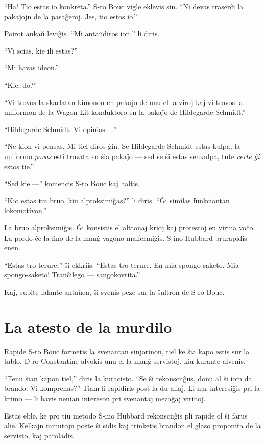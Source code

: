 ``Ha! Tio estas io konkreta.'' S-ro Bouc vigle eklevis sin. ``Ni devas traserĉi la pakaĵojn de la pasaĝeroj. Jes, tio estos io.''

Poirot ankaŭ leviĝis. ``Mi antaŭdiros ion,'' li diris.

``Vi scias, kie ili estas?''

``Mi havas ideon.''

``Kie, do?''

``Vi trovos la skarlatan kimonon en pakaĵo de unu el la viroj kaj vi trovos la uniformon de la Wagon Lit konduktoro en la pakaĵo de Hildegarde Schmidt.''

``Hildegarde Schmidt. Vi opinias---.''

``Ne kion vi pensas. Mi tiel diros ĝin. Se Hildegarde Schmidt estas kulpa, la uniformo \emph{povas} esti trovata en ŝia pakaĵo --- sed se ŝi estas senkulpa, tute \emph{certe ĝi} estos tie.''

``Sed kiel---'' komencis S-ro Bouc kaj haltis.

``Kio estas tiu bruo, kiu alproksimiĝas?'' li diris. ``Ĝi similas funkciantan lokomotivon.''

La bruo alproksimiĝis. Ĝi konsistis el alttonaj krioj kaj protestoj en virina voĉo. La pordo ĉe la fino de la manĝ-vagono malfermiĝis. S-ino Hubbard brurapidis enen.

``Estas tro terure,'' ŝi ekkriis. ``Estas tro terure. En mia spongo-saketo. Mia spongo-saketo! Tranĉilego --- sangokovrita.''

Kaj, subite falante antaŭen, ŝi svenis peze sur la ŝultron de S-ro Bouc.

\chapter[La atesto de la murdilo]{La atesto de la murdilo}


Rapide S-ro Bouc formetis la svenantan sinjorinon, tiel ke ŝia kapo estis sur la tablo. D-ro Constantine alvokis unu el la manĝ-servistoj, kiu kurante alvenis.

``Tenu ŝian kapon tiel,'' diris la kuracisto. ``Se ŝi rekonsciiĝus, donu al ŝi iom da brando. Vi komprenas?'' Tiam li rapidiris post la du aliaj. Li nur interesiĝis pri la krimo --- li havis nenian intereson pri svenantaj mezaĝaj virinoj.

Estas eble, ke pro tiu metodo S-ino Hubbard rekonsciiĝis pli rapide ol ŝi farus alie. Kelkajn minutojn poste ŝi sidis kaj trinketis brandon el glaso proponita de la servisto, kaj paroladis.

